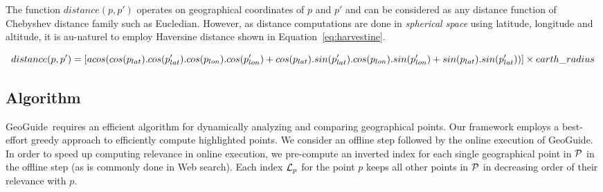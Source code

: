 \documentclass[conference,compsoc]{IEEEtran}
\newtheorem{problem}{Problem}
\newcommand{\framework}{{\sc GeoGuide}}
\newcommand{\pb}{{\sc GeoGuide}}
\begin{document}
The function $\mathit{distance}(p,p')$ operates on geographical coordinates of $p$ and $p'$ and can be considered as any distance function of Chebyshev distance family such as Eucledian. However, as distance computations are done in {\em spherical space} using latitude, longitude and altitude, it is au-naturel to employ Haversine distance shown in Equation~\ref{eq:harvestine}.

\begin{dmath}
	\label{eq:harvestine}
	distance(p,p') = [ acos(cos(p_{lat}) . cos(p'_{lat}) . cos(p_{lon}) . cos(p'_{lon})\\ + cos(p_{lat}) . sin(p'_{lat}). cos(p_{lon}) . sin(p'_{lon}) + sin(p_{lat}) . sin(p'_{lat})) ] \times earth\_radius
\end{dmath}




\subsection{Algorithm}
\label{sec:algo}

\framework\ requires an efficient algorithm for dynamically analyzing and comparing geographical points. Our framework employs a best-effort greedy approach to efficiently compute highlighted points. We consider an offline step followed by the online execution of \framework.
In order to speed up computing relevance in online execution, we pre-compute an inverted index for each single geographical point in ${\cal P}$ in the offline step (as is commonly done in Web search). Each index ${\cal L}_p$ for the point $p$ keeps all other points in ${\cal P}$ in decreasing order of their relevance with $p$.
\end{document}
